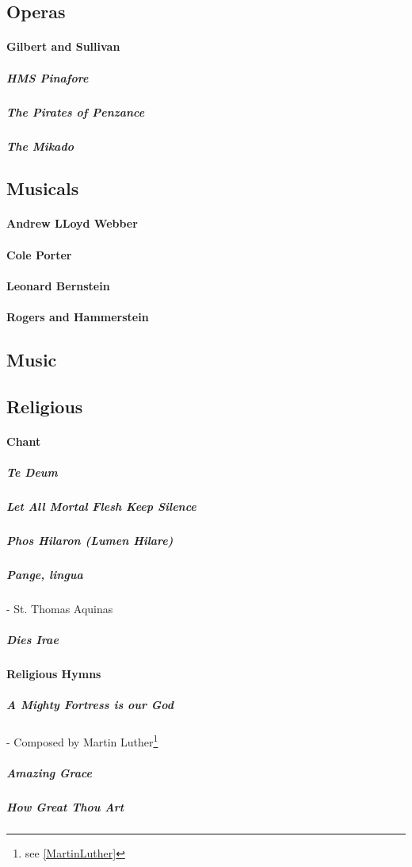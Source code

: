 			
		\subsection{Operas}
		
		
		
		\paragraph{Gilbert and Sullivan}
			\subparagraph{HMS Pinafore}
			\subparagraph{The Pirates of Penzance}
			\subparagraph{The Mikado}
		\subsection{Musicals}

		\paragraph{Andrew LLoyd Webber}
		\paragraph{Cole Porter}
		\paragraph{Leonard Bernstein}
		\paragraph{Rogers and Hammerstein}
		
		\subsection{Music}
			\subsection{Religious}
				\paragraph{Chant}
					\subparagraph{Te Deum}
					\subparagraph{Let All Mortal Flesh Keep Silence}
					\subparagraph{Phos Hilaron (Lumen Hilare)}
					\subparagraph{Pange, lingua} - St. Thomas Aquinas
					\subparagraph{Dies Irae}
				\paragraph{Religious Hymns}
					\subparagraph{A Mighty Fortress is our God} - Composed by Martin Luther\footnote{see \cref{MartinLuther} }
					\subparagraph{Amazing Grace}
					\subparagraph{How Great Thou Art}


